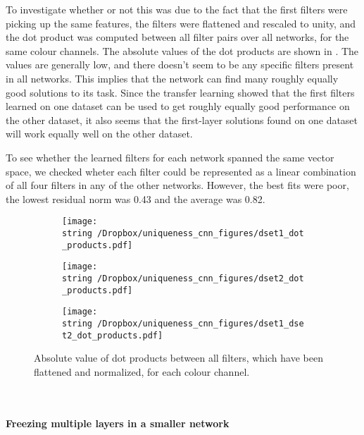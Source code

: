 To investigate whether or not this was due to the fact that the first filters were picking up the same features, the filters were flattened and rescaled to unity, and the dot product was computed between all filter pairs over all networks, for the same colour channels. The absolute values of the dot products are shown in . The values are generally low, and there doesn't seem to be any specific filters present in all networks. This implies that the network can find many roughly equally good solutions to its task. Since the transfer learning showed that the first filters learned on one dataset can be used to get roughly equally good performance on the other dataset, it also seems that the first-layer solutions found on one dataset will work equally well on the other dataset.

To see whether the learned filters for each network spanned the same vector space, we checked wheter each filter could be represented as a linear combination of all four filters in any of the other networks. However, the best fits were poor, the lowest residual norm was 0.43 and the average was 0.82. 


\begin{figure}[h!]
  \begin{subfigure}{\textwidth}
    \texttt{[image: \\string~/Dropbox/uniqueness\_cnn\_figures/dset1\_dot\_products.pdf]}
  \end{subfigure}
  \begin{subfigure}{\textwidth}
    \texttt{[image: \\string~/Dropbox/uniqueness\_cnn\_figures/dset2\_dot\_products.pdf]}
  \end{subfigure}
  \begin{subfigure}{\textwidth}
    \texttt{[image: \\string~/Dropbox/uniqueness\_cnn\_figures/dset1\_dset2\_dot\_products.pdf]}
  \end{subfigure}
  \caption{Absolute value of dot products between all filters, which have been flattened and normalized, for each colour channel.}
  \label{fig:dot_products_cifar5}
\end{figure}

\newpage~\newpage

\paragraph{Freezing multiple layers in a smaller network}~\\

